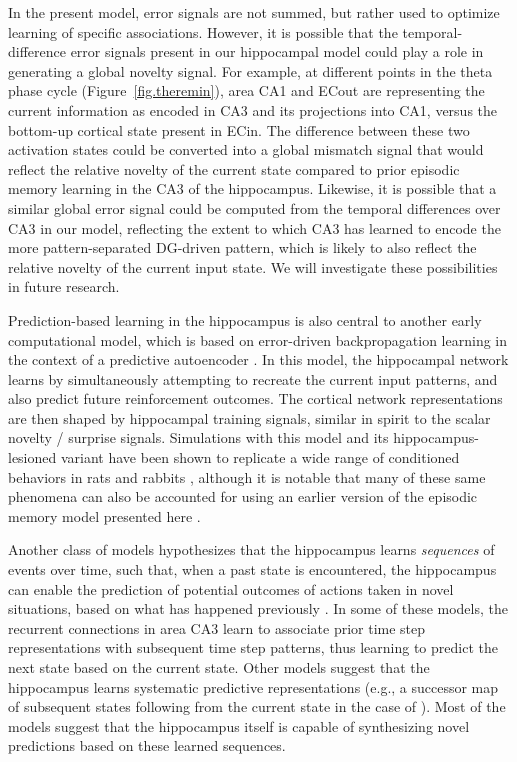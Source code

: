 \documentclass[11pt,twoside]{article}
\newif\myifpdf
\begin{document}
In the present model, error signals are not summed, but rather used to optimize learning of specific associations.  However, it is possible that the temporal-difference error signals present in our hippocampal model could play a role in generating a global novelty signal.  For example, at different points in the theta phase cycle (Figure~\ref{fig.theremin}), area CA1 and ECout are representing the current information as encoded in CA3 and its projections into CA1, versus the bottom-up cortical state present in ECin. The difference between these two activation states could be converted into a global mismatch signal that would reflect the relative novelty of the current state compared to prior episodic memory learning in the CA3 of the hippocampus.  Likewise, it is possible that a similar global error signal could be computed from the temporal differences over CA3 in our model, reflecting the extent to which CA3 has learned to encode the more pattern-separated DG-driven pattern, which is likely to also reflect the relative novelty of the current input state.  We will investigate these possibilities in future research. 

Prediction-based learning in the hippocampus is also central to another early computational model, which is based on error-driven backpropagation learning in the context of a predictive autoencoder \citep{MyersGluck95}.  In this model, the hippocampal network learns by simultaneously attempting to recreate the current input patterns, and also predict future reinforcement outcomes.  The cortical network representations are then shaped by hippocampal training signals, similar in spirit to the scalar novelty / surprise signals.  Simulations with this model and its hippocampus-lesioned variant have been shown to replicate a wide range of conditioned behaviors in rats and rabbits \citep{GluckMyers94}, although it is notable that many of these same phenomena can also be accounted for using an earlier version of the episodic memory model presented here \citep{OReillyRudy01}. 

Another class of models hypothesizes that the hippocampus learns \emph{sequences} of events over time, such that, when a past state is encountered, the hippocampus can enable the prediction of potential outcomes of actions taken in novel situations, based on what has happened previously \citep{Levy96,WallensteinHasselmo97,JensenLisman96,TsodyksSkaggsSejnowskiEtAl96,Rolls13,SchapiroTurk-BrowneBotvinickEtAl17,StachenfeldBotvinickGershman17}. In some of these models, the recurrent connections in area CA3 learn to associate prior time step representations with subsequent time step patterns, thus learning to predict the next state based on the current state.  Other models suggest that the hippocampus learns systematic predictive representations (e.g., a successor map of subsequent states following from the current state in the case of \citealp{StachenfeldBotvinickGershman17}).  Most of the models suggest that the hippocampus itself is capable of synthesizing novel predictions based on these learned sequences. 
\end{document}
